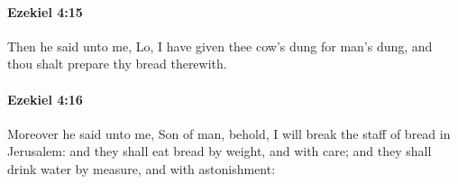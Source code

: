 		\paragraph{Ezekiel 4:15} %
			\label{EZEKIEL-4-15}

			Then he said unto me, Lo, I have given thee cow’s dung for man’s dung, and thou shalt prepare thy bread therewith.


		\paragraph{Ezekiel 4:16} %
			\label{EZEKIEL-4-16}

			Moreover he said unto me, Son of man, behold, I will break the staff of bread in Jerusalem: and they shall eat bread by weight, and with care; and they shall drink water by measure, and with astonishment:


